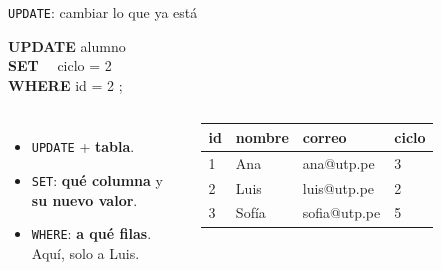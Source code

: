 \documentclass[aspectratio=169,10pt,c]{beamer}
\newcommand{\kw}[1]{\textcolor{utpRojo}{\textbf{#1}}}
\newcommand{\nuevo}[1]{{%
  \setlength{\fboxsep}{1.2pt}%
  \begingroup
  \renewcommand{\kw}[1]{\textcolor{utpNegro}{\textbf{##1}}}%
  \colorbox{yellow!45}{\textcolor{utpNegro}{#1}}%
  \endgroup}}
\newenvironment{sqlcode}[1][.86\textwidth]
  {\begin{center}\begin{lrbox}{\sqlbuf}\begin{minipage}{#1}\ttfamily\footnotesize\vspace{6pt}\raggedright}
  {\vspace{6pt}\end{minipage}\end{lrbox}\colorbox{utpGrisClaro}{\usebox{\sqlbuf}}\end{center}}
\begin{document}
\begin{frame}{\texttt{UPDATE}: cambiar lo que ya está}
\begin{sqlcode}[.78\textwidth]
\kw{UPDATE} alumno\\
\kw{SET} \ \ ciclo = 2\\
\nuevo{\kw{WHERE} id = 2};
\end{sqlcode}
\vspace{0.1cm}
\begin{columns}[c,onlytextwidth]
\small
\begin{itemize}\setlength\itemsep{4pt}
  \item \texttt{UPDATE} + \textbf{tabla}.
  \item \texttt{SET}: \textbf{qué columna} y \textbf{su nuevo valor}.
  \item \texttt{WHERE}: \textbf{a qué filas}. Aquí, solo a Luis.
\end{itemize}
\centering\scriptsize\ttfamily
\begin{tabular}{llll}
\toprule
\normalfont\bfseries id & \normalfont\bfseries nombre & \normalfont\bfseries correo & \normalfont\bfseries ciclo \\
\midrule
1 & Ana & ana@utp.pe & 3 \\
2 & Luis & luis@utp.pe & \nuevo{2} \\
3 & Sofía & sofia@utp.pe & 5 \\
\bottomrule
\end{tabular}
\end{columns}
\vspace{0.35cm}
\end{frame}
\end{document}
